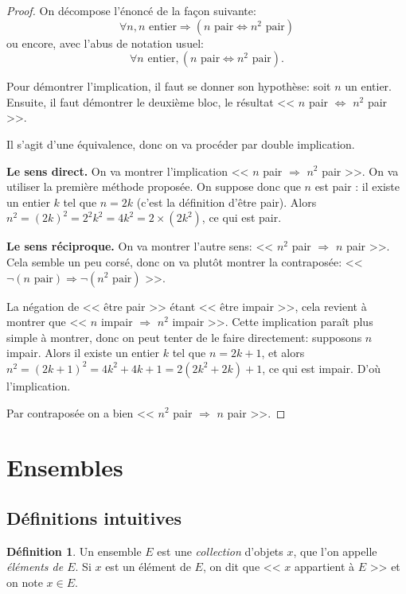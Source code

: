 \documentclass[11pt]{article}
\theoremstyle{definition}
\newtheorem{defn}{Définition}[section]
\theoremstyle{remark}
\begin{document}
\begin{proof}
	On décompose l'énoncé de la façon suivante:
	\[ \forall n,n\text{ entier}\Rightarrow (n\text{ pair}\Leftrightarrow n^2\text{ pair}) \]
	ou encore, avec l'abus de notation usuel:
	\[ \forall n\text{ entier},(n\text{ pair}\Leftrightarrow n^2\text{ pair}). \]
	
	Pour démontrer l'implication, il faut se donner son hypothèse: soit $n$ un entier. Ensuite, il faut démontrer le deuxième bloc, le résultat << $n$ pair $\Leftrightarrow$ $n^2$ pair >>.
	
	Il s'agit d'une équivalence, donc on va procéder par double implication.
	
	\textbf{Le sens direct.} On va montrer l'implication << $n$ pair $\Rightarrow$ $n^2$ pair >>. On va utiliser la première méthode proposée. On suppose donc que $n$ est pair : il existe un entier $k$ tel que $n=2k$ (c'est la définition d'être pair). Alors $n^2=(2k)^2=2^2k^2=4k^2=2\times (2k^2)$, ce qui est pair.
	
	\textbf{Le sens réciproque.} On va montrer l'autre sens: << $n^2$ pair $\Rightarrow$ $n$ pair >>. Cela semble un peu corsé, donc on va plutôt montrer la contraposée: << $\neg(n\text{ pair})\Rightarrow \neg(n^2\text{ pair})$ >>.
	
	La négation de << être pair >> étant << être impair >>, cela revient à montrer que << $n$ impair $\Rightarrow$ $n^2$ impair >>. Cette implication paraît plus simple à montrer, donc on peut tenter de le faire directement: supposons $n$ impair. Alors il existe un entier $k$ tel que $n=2k+1$, et alors $n^2=(2k+1)^2=4k^2+4k + 1 = 2(2k^2+2k)+1$, ce qui est impair. D'où l'implication.
	
	Par contraposée on a bien << $n^2$ pair $\Rightarrow$ $n$ pair >>.
\end{proof}


\section{Ensembles}

\subsection{Définitions intuitives}

\begin{defn}
	Un ensemble $E$ est une \textit{collection} d'objets $x$, que l'on appelle \textit{éléments de $E$}. Si $x$ est un élément de $E$, on dit que << $x$ appartient à $E$ >> et on note $x\in E$.
\end{defn}
\end{document}
